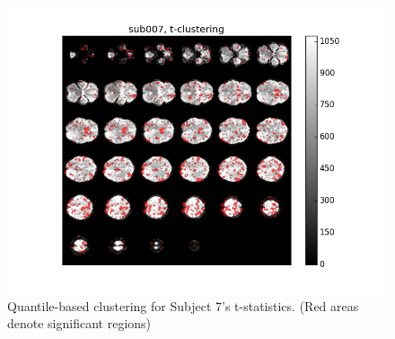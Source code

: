 \begin{figure}[H]
\begin{minipage}[b]{0.66\linewidth}
	\centering
		\includegraphics[width=.8\linewidth]{../images/sub007_t_overlay.png} 
	\caption{Quantile-based clustering for Subject 7's t-statistics. 
	(Red areas denote significant regions)}
	\label{fig:clustersub7}
\end{minipage}
\end{figure}




